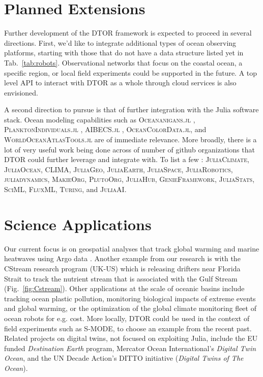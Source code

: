 \documentclass{juliacon}[12pt]
\newcommand{\pkg}[1]{{\small \textsc{#1}}}
\begin{document}
\section{Planned Extensions}

Further development of the DTOR framework is expected to proceed in several directions. First, we'd like to integrate additional types of ocean observing platforms, starting with those that do not have a data structure listed yet in Tab.~\ref{tab:robots}. Observational networks that focus on the coastal ocean, a specific region, or local field experiments could be supported in the future. A top level API to interact with DTOR as a whole through cloud services is also envisioned.

A second direction to pursue is that of further integration with the Julia software stack. Ocean modeling capabilities such as \pkg{Oceananigans.jl} \cite{OceananigansJOSS}, \pkg{PlanktonIndividuals.jl} \cite{Wu2022}, \pkg{AIBECS.jl} \cite{Pasquier2022}, \pkg{OceanColorData.jl}, and \pkg{WorldOceanAtlasTools.jl} are of immediate relevance. More broadly, there is a lot of very useful work being done across of number of github organizations that DTOR could further leverage and integrate with. To list a few : \pkg{JuliaClimate}, \pkg{JuliaOcean}, \pkg{CLIMA}, \pkg{JuliaGeo}, \pkg{JuliaEarth}, \pkg{JuliaSpace}, \pkg{JuliaRobotics}, \pkg{juliadynamics}, \pkg{MakieOrg}, \pkg{PlutoOrg}, \pkg{JuliaHub}, \pkg{GenieFramework}, \pkg{JuliaStats}, \pkg{SciML}, \pkg{FluxML}, \pkg{Turing}, and \pkg{JuliaAI}. 


\section{Science Applications}

Our current focus is on geospatial analyses that track global warming and marine heatwaves using Argo data \cite{Forget2024a}. Another example from our research is with the CStream research program (UK-US) which is releasing drifters near Florida Strait to track the nutrient stream that is associated with the Gulf Stream (Fig.~\ref{fig:Cstream}). Other applications at the scale of oceanic basins include tracking ocean plastic pollution, monitoring biological impacts of extreme events and global warming, or the optimization of the global climate monitoring fleet of ocean robots for e.g. cost. More locally, DTOR could be used in the context of field experiments such as S-MODE, to choose an example from the recent past. Related projects on digital twins, not focused on exploiting Julia, include the EU funded {\it Destination Earth} program, Mercator Ocean International's {\it Digital Twin Ocean}, and the UN Decade Action's DITTO initiative ({\it Digital Twins of The Ocean}).
\end{document}
